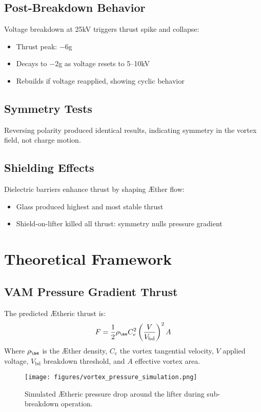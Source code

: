     \subsection{Post-Breakdown Behavior}
    Voltage breakdown at 25kV triggers thrust spike and collapse:
    \begin{itemize}
        \item Thrust peak: $-6$g
        \item Decays to $-2$g as voltage resets to 5--10kV
        \item Rebuilds if voltage reapplied, showing cyclic behavior
    \end{itemize}

    \subsection{Symmetry Tests}
    Reversing polarity produced identical results, indicating symmetry in the vortex field, not charge motion.

    \subsection{Shielding Effects}
    Dielectric barriers enhance thrust by shaping Æther flow:
    \begin{itemize}
        \item Glass produced highest and most stable thrust
        \item Shield-on-lifter killed all thrust: symmetry nulls pressure gradient
    \end{itemize}

    \section{Theoretical Framework}
    \subsection{VAM Pressure Gradient Thrust}
    The predicted Ætheric thrust is:
    \begin{equation}
        F = \frac{1}{2} \rho_{\ae} C_e^2 \left( \frac{V}{V_{\text{bd}}} \right)^2 A
    \end{equation}
    Where $\rho_{\ae}$ is the Æther density, $C_e$ the vortex tangential velocity, $V$ applied voltage, $V_{\text{bd}}$ breakdown threshold, and $A$ effective vortex area.

    \begin{figure}[h!]
        \centering
        \texttt{[image: figures/vortex\_pressure\_simulation.png]}
        \caption{Simulated Ætheric pressure drop around the lifter during sub-breakdown operation.}
    \end{figure}

